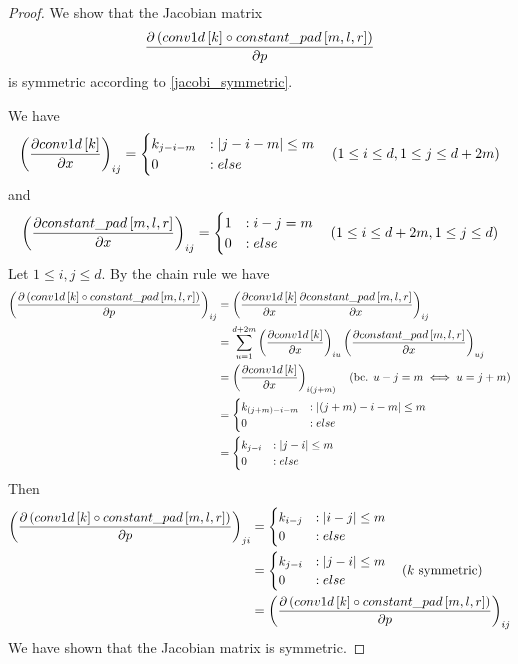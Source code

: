 \documentclass[twoside,a4paper]{article}
\begin{document}
\begin{proof}
	We show that the Jacobian matrix 
	\begin{equation*}
		\frac{\partial \left( conv1d \left[ k \right] \circ constant\_pad \left[ m,l,r \right] \right)}{\partial p}
	\end{equation*}
	is symmetric according to \cref{jacobi_symmetric}.

	We have
	\begin{equation*}
		\left( \frac{\partial conv1d \left[ k \right]}{\partial x} \right)_{ij} = \begin{cases}
			k_{j-i-m} & : \left|{j-i-m}\right| \leq m \\
			0 & : else
		\end{cases}
		\quad (1 \leq i \leq d, 1 \leq j \leq d+2m)
	\end{equation*}
	and
	\begin{equation*}
		\left( \frac{\partial constant\_pad \left[ m,l,r \right]}{\partial x} \right)_{ij} = \begin{cases}
			1 & : i-j=m \\
			0 & : else
		\end{cases}
		\quad (1 \leq i \leq d+2m, 1 \leq j \leq d)
	\end{equation*}
	Let $1 \leq i,j \leq d$. By the chain rule we have
	\begin{align*}
		\left( \frac{\partial \left( conv1d \left[ k \right] \circ constant\_pad \left[ m,l,r \right] \right)}{\partial p} \right)_{ij}
		&= \left(  
			\frac{\partial conv1d \left[ k \right]}{\partial x}
			\frac{\partial constant\_pad \left[ m,l,r \right]}{\partial x} 
		\right)_{ij} \\
		&= \sum_{u=1}^{d+2m} \left( \frac{\partial conv1d \left[ k \right]}{\partial x} \right)_{iu}
		\left( \frac{\partial constant\_pad \left[ m,l,r \right]}{\partial x} \right)_{uj} \\
		&= \left( \frac{\partial conv1d \left[ k \right]}{\partial x} \right)_{i(j+m)}
		\quad (\text{bc. } u-j=m \iff u=j+m) \\
		&= \begin{cases}
			k_{(j+m)-i-m} & : \left|{(j+m)-i-m}\right| \leq m \\
			0 & : else
		\end{cases} \\
		&= \begin{cases}
			k_{j-i} & : \left|{j-i}\right| \leq m \\
			0 & : else
		\end{cases}
	\end{align*}
	Then 
	\begin{align*}
		\left( \frac{\partial \left( conv1d \left[ k \right] \circ constant\_pad \left[ m,l,r \right] \right)}{\partial p} \right)_{ji}
		&= \begin{cases}
			k_{i-j} & : \left|{i-j}\right| \leq m \\
			0 & : else
		\end{cases} \\
		&= \begin{cases}
			k_{j-i} & : \left|{j-i}\right| \leq m \\
			0 & : else
		\end{cases} \quad \text{($k$ symmetric)} \\
		&= \left( \frac{\partial \left( conv1d \left[ k \right] \circ constant\_pad \left[ m,l,r \right] \right)}{\partial p} \right)_{ij}
	\end{align*}
	We have shown that the Jacobian matrix is symmetric.
\end{proof}
\end{document}
